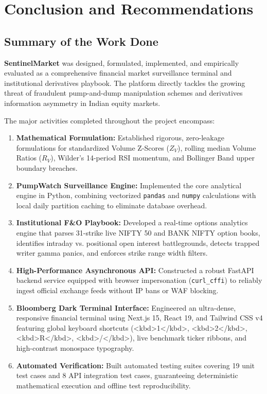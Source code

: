 \chapter{Conclusion and Recommendations}

\section{Summary of the Work Done}
\textbf{SentinelMarket} was designed, formulated, implemented, and empirically evaluated as a comprehensive financial market surveillance terminal and institutional derivatives playbook. The platform directly tackles the growing threat of fraudulent pump-and-dump manipulation schemes and derivatives information asymmetry in Indian equity markets.

The major activities completed throughout the project encompass:
\begin{enumerate}
    \item \textbf{Mathematical Formulation:} Established rigorous, zero-leakage formulations for standardized Volume Z-Scores ($Z_V$), rolling median Volume Ratios ($R_V$), Wilder's 14-period RSI momentum, and Bollinger Band upper boundary breaches.
    \item \textbf{PumpWatch Surveillance Engine:} Implemented the core analytical engine in Python, combining vectorized \texttt{pandas} and \texttt{numpy} calculations with local daily partition caching to eliminate database overhead.
    \item \textbf{Institutional F\&O Playbook:} Developed a real-time options analytics engine that parses 31-strike live NIFTY 50 and BANK NIFTY option books, identifies intraday vs. positional open interest battlegrounds, detects trapped writer gamma panics, and enforces strike range width filters.
    \item \textbf{High-Performance Asynchronous API:} Constructed a robust FastAPI backend service equipped with browser impersonation (\texttt{curl\_cffi}) to reliably ingest official exchange feeds without IP bans or WAF blocking.
    \item \textbf{Bloomberg Dark Terminal Interface:} Engineered an ultra-dense, responsive financial terminal using Next.js 15, React 19, and Tailwind CSS v4 featuring global keyboard shortcuts (<kbd>1</kbd>, <kbd>2</kbd>, <kbd>R</kbd>, <kbd>/</kbd>), live benchmark ticker ribbons, and high-contrast monospace typography.
    \item \textbf{Automated Verification:} Built automated testing suites covering 19 unit test cases and 8 API integration test cases, guaranteeing deterministic mathematical execution and offline test reproducibility.
\end{enumerate}

